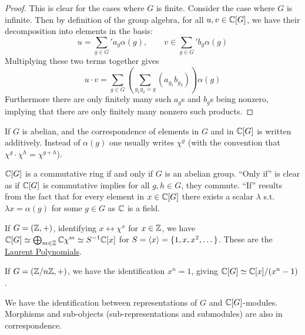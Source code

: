 \documentclass{article}
\begin{document}
\begin{proof}
    This is clear for the cases where $G$ is finite. Consider the case where $G$ is infinite. Then by definition of the group algebra, for all $u, v \in \mathbb{C}[G]$, we have their decomposition into elements in the basis:
    \[
        u = \sum_{g \in G}' a_g \alpha(g), \qquad v \in \sum_{g \in G}' b_g \alpha(g)
    \]
    Multiplying these two terms together gives
    \[
        u \cdot v = \sum_{g \in G} \left( \sum_{g_1 g_2 = g}  (a_{g_1} b_{g_2}) \right) \alpha(g)
    \]
    Furthermore there are only finitely many such $a_g$s and $b_g$s being nonzero, implying that there are only finitely many nonzero such products. 
\end{proof}

\begin{notation}
    If $G$ is abelian, and the correspondence of elements in $G$ and in $\mathbb{C}[G]$ is written additively. Instead of $\alpha(g)$ one usually writes $\chi^g$ (with the convention that $\chi^g \cdot \chi^h = \chi^{g + h}$).
\end{notation}

\begin{remark}
    $\mathbb{C}[G]$ is a commutative ring if and only if $G$ is an abelian group. ``Only if'' is clear as if $\mathbb{C}[G]$ is commutative implies for all $g, h \in G$, they commute. ``If'' results from the fact that for every element in $x \in \mathbb{C}[G]$ there exists a scalar $\lambda$ s.t. $\lambda x = \alpha(g)$ for some $g \in G$ as $\mathbb{C}$ is a field.
\end{remark}

\begin{example}
    If $G = (\mathbb{Z}, +)$, identifying $x \leftrightarrow \chi^x$ for $x \in \mathbb{Z}$, we have $\mathbb{C}[G] \simeq \bigoplus_{m\in \mathbb{Z}} \mathbb{C}\chi^m \simeq S^{-1}\mathbb{C}[x]$ for $S = \left\langle x \right\rangle = \{1, x, x^2, \dots\}$. These are the \underline{Laurent Polynomials}. 
    
    If $G = (\mathbb{Z}/n\mathbb{Z}, +)$, we have the identification $x^n = 1$, giving $\mathbb{C}[G] \simeq \mathbb{C}[x]/(x^n - 1)$.
\end{example}

\begin{proposition}\label{prop: repr of G identifiable with C[G]-modules}
    We have the identification between representations of $G$ and $\mathbb{C}[G]$-modules. Morphisms and sub-objects (sub-representations and submodules) are also in correspondence.
\end{proposition}
\end{document}
